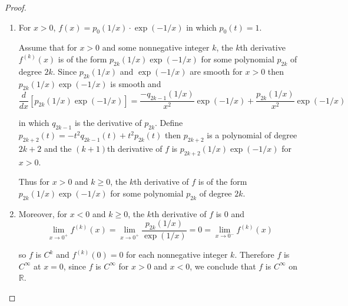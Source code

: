 \begin{proof}
    \begin{enumerate}[label={(\alph*)}]
        \item For \( x > 0 \), \( f(x) = p_{0}(1/x)\cdot \exp(-1/x) \) in which \( p_{0}(t) = 1 \).

              Assume that for \( x > 0 \) and some nonnegative integer \( k \), the \(k\)th derivative \( f^{(k)}(x) \) is of the form \( p_{2k}(1/x) \exp(-1/x) \) for some polynomial \( p_{2k} \) of degree \( 2k \). Since \( p_{2k}(1/x) \) and \( \exp(-1/x) \) are smooth for \( x > 0 \) then \( p_{2k}(1/x)\exp(-1/x) \) is smooth and
              \[
                  \frac{d}{dx} [p_{2k}(1/x)\exp(-1/x)] = \frac{-q_{2k-1}(1/x)}{x^{2}}\exp(-1/x) + \frac{p_{2k}(1/x)}{x^{2}}\exp(-1/x)
              \]

              in which \( q_{2k-1} \) is the derivative of \( p_{2k} \). Define \( p_{2k+2}(t) = -t^{2}q_{2k-1}(t) + t^{2}p_{2k}(t) \) then \( p_{2k+2} \) is a polynomial of degree \( 2k + 2 \) and the \( (k+1) \)th derivative of \( f \) is \( p_{2k+2}(1/x)\exp(-1/x) \) for \( x > 0 \).

              Thus for \( x > 0 \) and \( k \ge 0 \), the \( k \)th derivative of \( f \) is of the form \( p_{2k}(1/x)\exp(-1/x) \) for some polynomial \( p_{2k} \) of degree \( 2k \).
        \item  Moreover, for \( x < 0 \) and \( k \ge 0 \), the \( k \)th derivative of \( f \) is 0 and
              \[
                  \lim\limits_{x\to 0^{+}} f^{(k)}(x) = \lim\limits_{x\to 0^{+}} \frac{p_{2k}(1/x)}{\exp(1/x)} = 0 = \lim\limits_{x\to 0^{-}} f^{(k)}(x)
              \]

              so \( f \) is \( C^{k} \) and \( f^{(k)}(0) = 0 \) for each nonnegative integer \( k \). Therefore \( f \) is \( C^{\infty} \)  at \( x = 0 \), since \( f \) is \( C^{\infty} \) for \( x > 0 \) and \( x < 0 \), we conclude that \( f \) is \( C^{\infty} \) on \( \mathbb{R} \).
    \end{enumerate}
\end{proof}

